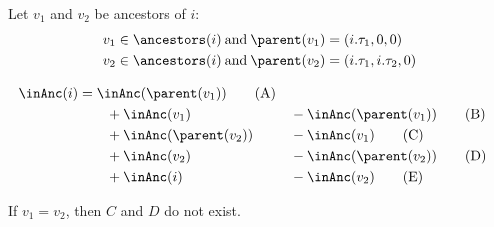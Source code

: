 Let $v_1$ and $v_2$ be ancestors of $i$:
\begin{align*}
	v_1 \in \ancestors(i) &\booland \parent(v_1) = (i.\tau_1, 0, 0) \\
	v_2 \in \ancestors(i) &\booland \parent(v_2) = (i.\tau_1, i.\tau_2, 0)
\end{align*}

\begin{alignat}{2}
	\inAnc(i) &= \inAnc(\parent(v_1)) \tag{A}\\
	&\qquad + \inAnc(v_1) &&- \inAnc(\parent(v_1)) \tag{B}\\
	&\qquad + \inAnc(\parent(v_2)) &&- \inAnc(v_1) \tag{C}\\
	&\qquad + \inAnc(v_2) &&- \inAnc(\parent(v_2)) \tag{D}\\
	&\qquad + \inAnc(i) &&- \inAnc(v_2) \tag{E}
\end{alignat}

If $v_1 = v_2$, then $C$ and $D$ do not exist.


